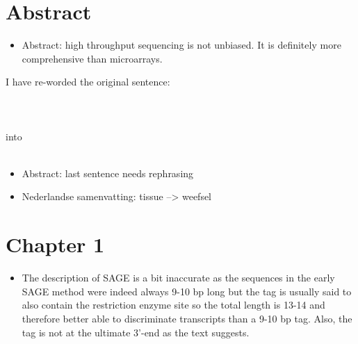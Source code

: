 \documentclass[12pt,a4paper,sans]{article}
\begin{document}
\section{Abstract}

\begin{itemize}
   \item{Abstract: high throughput sequencing is not unbiased. It is definitely more comprehensive than microarrays.}
\end{itemize}
\noindent

I have re-worded the original sentence:
\\\\
\\\\
into
\\\\

\begin{itemize}
   \item{Abstract: last sentence needs rephrasing}
\end{itemize}

\begin{itemize}
   \item{Nederlandse samenvatting: tissue --> weefsel}
\end{itemize}

\section{Chapter 1}

\begin{itemize}
   \item{The description of SAGE is a bit inaccurate as the sequences in the early SAGE method were indeed always 9-10 bp long but the tag is usually said to also contain the restriction enzyme site so the total length is 13-14 and therefore better able to discriminate transcripts than a 9-10 bp tag. Also, the tag is not at the ultimate 3’-end as the text suggests.}
\end{itemize}
\end{document}
